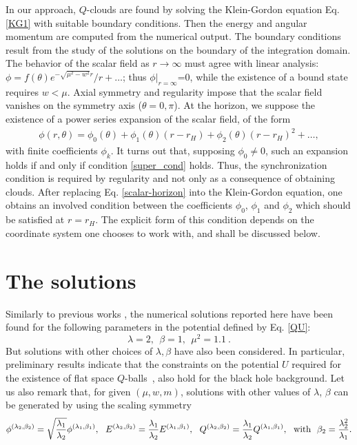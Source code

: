  
In our approach, $Q$-clouds are found by solving the Klein-Gordon equation Eq. \eqref{KG1}
with suitable boundary conditions.  
Then the energy and angular momentum are computed
from the numerical output.
The boundary conditions result from the study of the solutions
on the boundary of the integration domain. 
The behavior of the scalar field as $r\to \infty$ must agree
with linear analysis: $\phi=f(\theta)  {e^{-\sqrt{\mu^2-w^2}r}}/{r}+\dots$;
thus $\phi|_{r=\infty}$=0, while the existence of a bound state requires $w <\mu $.
Axial symmetry and
regularity impose that the scalar field vanishes on the symmetry axis ($\theta=0,\pi$).
At the horizon, we suppose the existence of a power series expansion of the scalar field,
of the form
\begin{eqnarray}
\label{scalar-horizon}
\phi(r,\theta)=\phi_{0}( \theta)+\phi_{1}( \theta)(r-r_H)+\phi_{2}( \theta)(r-r_H)^2+\dots,
\end{eqnarray}
with finite coefficients $\phi_{k}$.
%
It turns out that, supposing $\phi_{0}\neq 0$, such an expansion holds if and only if condition \eqref{super_cond} holds. 
Thus, the synchronization condition is required by regularity and not only as a consequence of obtaining clouds.
After replacing Eq. \eqref{scalar-horizon} into the Klein-Gordon equation, one obtains an involved condition between the coefficients
$\phi_{0}$, $\phi_{1}$ and $\phi_{2}$ 
which should be satisfied at $r=r_H$.
The explicit form of this condition depends on the coordinate system one chooses to work with,
and shall be discussed below.

 

\section{The solutions}

 
Similarly to previous works 
\cite{Volkov:2002aj,Kleihaus:2005me}, 
the  numerical solutions reported here have been found for 
the following parameters in 
the potential
defined by Eq. \eqref{QU}:
%
\begin{equation}
\lambda = 2,~~\beta=1,~~\mu^2=1.1~.
\label{param}
\end{equation} 
But solutions with other choices of $\lambda,\beta$
have also been considered.
%
In particular, preliminary results indicate that the constraints
on the potential $U$  required
for the existence of flat space $Q$-balls~\cite{Coleman:1985ki}, 
also hold for the black hole background. 
%
Let us also remark that,
for given $(\mu,w,m)$,
solutions with other values of $\lambda$, $\beta$
can be generated by using the scaling symmetry
\begin{equation}
\phi^{(\lambda_2,\beta_2)}=\sqrt{\frac{\lambda_1}{\lambda_2}}\phi^{(\lambda_1,\beta_1)},~~
E^{(\lambda_2,\beta_2)}=\frac{\lambda_1}{\lambda_2}E^{(\lambda_1,\beta_1)},~~Q^{(\lambda_2,\beta_2)}=\frac{\lambda_1}{\lambda_2}Q^{(\lambda_1,\beta_1)},~~
{\rm with}~~\beta_2=\frac{\lambda_2^2}{\lambda_1}.
\label{symm}
\end{equation} 

